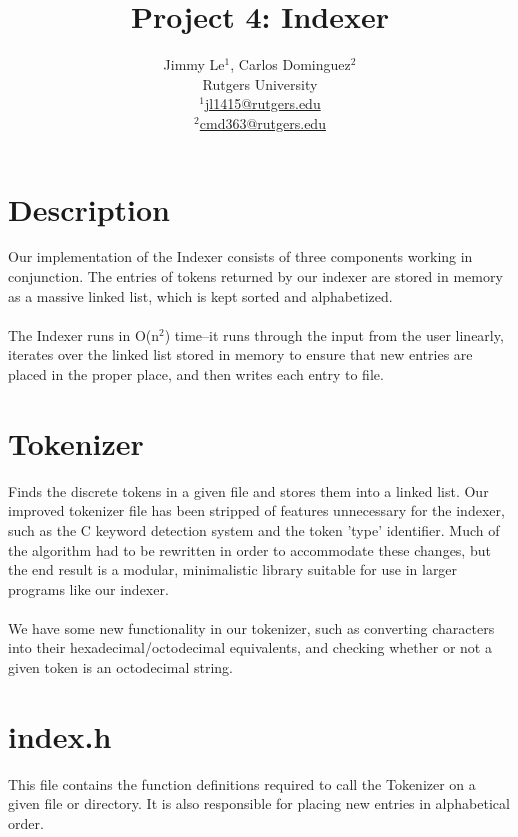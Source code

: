 \documentclass{article}
\title{Project 4: Indexer\\}
\date{}
\author{Jimmy Le$^{1}$, Carlos Dominguez$^{2}$\\
	Rutgers University\\
	\underline{$^{1}$jl1415@rutgers.edu}\\
	\underline{$^{2}$cmd363@rutgers.edu}}
\makeatletter
\renewcommand{\maketitle}{\bgroup\setlength{\parindent}{0pt}
\begin{flushleft}
  \textbf{\@title}
  \@author
\end{flushleft}\egroup
}
\makeatother
\begin{document}
\maketitle

\section{Description}
Our implementation of the Indexer consists of three components working in conjunction. The entries of tokens returned by our indexer are stored in memory as a massive linked list, which is kept sorted and alphabetized.
\\
\\
The Indexer runs in O(n$^2$) time--it runs through the input from the user linearly, iterates over the linked list stored in memory to ensure that new entries are placed in the proper place, and then writes each entry to file.

\section{Tokenizer}
Finds the discrete tokens in a given file and stores them into a linked list. Our improved tokenizer file has been stripped of features unnecessary for the indexer, such as the C keyword detection system and the token 'type' identifier. Much of the algorithm had to be rewritten in order to accommodate these changes, but the end result is a modular, minimalistic library suitable for use in larger programs like our indexer. 
\\
\\
We have some new functionality in our tokenizer, such as converting characters into their hexadecimal/octodecimal equivalents, and checking whether or not a given token is an octodecimal string.

\section{index.h}
This file contains the function definitions required to call the Tokenizer on a given file or directory. It is also responsible for placing new entries in alphabetical order.
\end{document}
